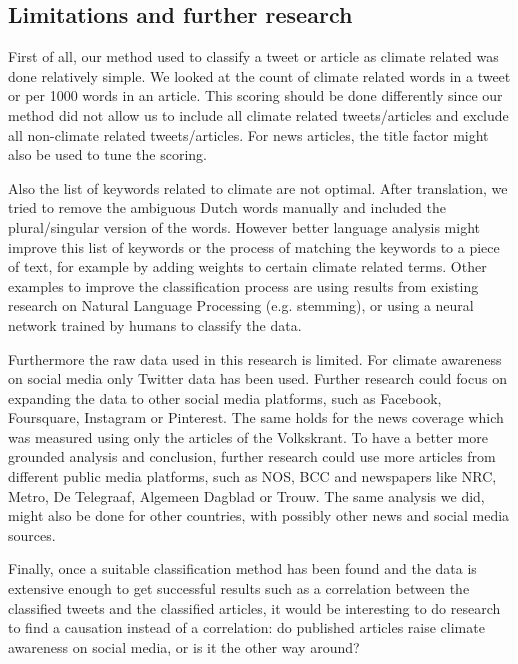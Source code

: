 \documentclass[paper=a4, fontsize=9px]{scrartcl} %
\numberwithin{equation}{section} %
\numberwithin{figure}{section} %
\numberwithin{table}{section} %
\begin{document}
\begin{multicols}{2}
\section{Limitations and further research}\label{sec:limitations}

First of all, our method used to classify a tweet or article as climate related was done relatively simple. We looked at the count of climate related words in a tweet or per 1000 words in an article. This scoring should be done differently since our method did not allow us to include all climate related tweets/articles and exclude all non-climate related tweets/articles. For news articles, the title factor might also be used to tune the scoring.

Also the list of keywords related to climate are not optimal. After translation, we tried to remove the ambiguous Dutch words manually and included the plural/singular version of the words. However better language analysis might improve this list of keywords or the process of matching the keywords to a piece of text, for example by adding weights to certain climate related terms. Other examples to improve the classification process are using results from existing research on Natural Language Processing (e.g. stemming), or using a neural network trained by humans to classify the data. 

Furthermore the raw data used in this research is limited. For climate awareness on social media only Twitter data has been used. Further research could focus on expanding the data to other social media platforms, such as Facebook, Foursquare, Instagram or Pinterest. The same holds for the news coverage which was measured using only the articles of the Volkskrant. To have a better more grounded analysis and conclusion, further research could use more articles from different public media platforms, such as NOS, BCC and newspapers like NRC, Metro, De Telegraaf, Algemeen Dagblad or Trouw. The same analysis we did, might also be done for other countries, with possibly other news and social media sources.

Finally, once a suitable classification method has been found and the data is extensive enough to get successful results such as a correlation between the classified tweets and the classified articles, it would be interesting to do research to find a causation instead of a correlation: do published articles raise climate awareness on social media, or is it the other way around?

\end{multicols}
\end{document}
